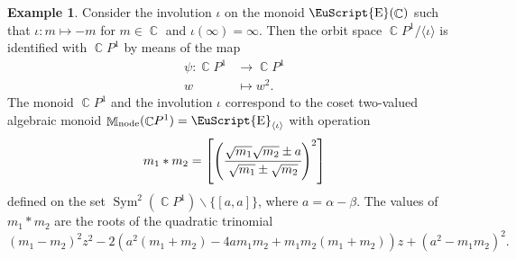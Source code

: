 \documentclass[14pt, dvipsnames]{extarticle}
\theoremstyle{plain}
\theoremstyle{definition}
\newtheorem{example}{\bf Example}
\theoremstyle{remark}
\DeclareMathOperator{\E}{\EuScript{E}}
\DeclareMathOperator{\Sym}{\mathrm{Sym}}
\DeclareMathOperator{\Cc}{\mathbb{C}}
\DeclareMathOperator{\M}{\mathbb{M}}
\DeclareMathOperator{\node}{\mathrm{node}}
\begin{document}
\begin{example}\label{M_nodal}
Consider the involution $\iota$ on the monoid $\E(\Cc)$ such that $\iota: m\mapsto -m$ for $m\in\Cc$ and $\iota(\infty) = \infty$. Then the orbit space $\Cc\!P^1/\langle \iota\rangle$ is identified with $\Cc\!P^1$ by means of the map
$$\begin{aligned}
\psi: \Cc\!P^1&\to \Cc\!P^1\\
w&\mapsto w^2.
\end{aligned}$$
The monoid $\Cc\!P^1$ and the involution $\iota$ correspond to the coset two-valued algebraic monoid $\M_{\node}(\Cc\!P^1) = \E_{\langle \iota \rangle}$ with operation
\begin{equation}\label{node_law}
m_1\ast m_2 = \left[ \left(\cfrac{\sqrt{m_1}\sqrt{m_2} \pm a}{\sqrt{m_1} \pm \sqrt{m_2}}\right)^2\right]
\end{equation}
defined on the set $\Sym^2(\Cc\!P^1)\backslash\{[a, a]\}$, where $a = \alpha - \beta$. The values of $m_1\ast m_2$ are the roots of the quadratic trinomial
$$(m_1 - m_2)^2z^2 - 2 \left(a^2 (m_1 + m_2)-4 a m_1 m_2+m_1 m_2 (m_1+m_2)\right)z + (a^2 - m_1 m_2)^2.$$


\end{example}
\end{document}
